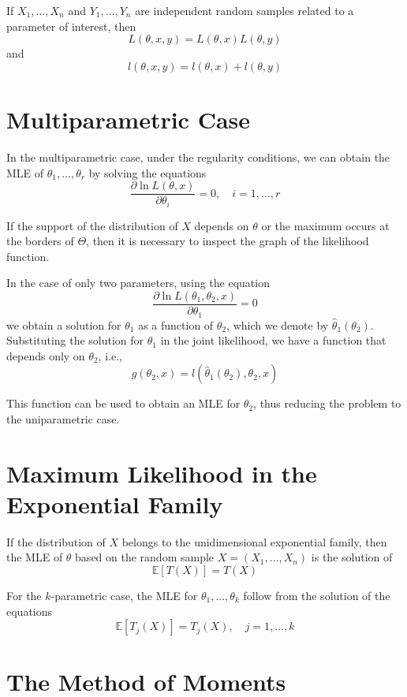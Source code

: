\documentclass[12pt,a4paper]{report}
\begin{document}
\begin{theorem}
    If $X_1, \ldots, X_n$ and $Y_1, \ldots, Y_n$ are independent random samples related to a parameter of interest, then 
    \[
        L(\theta, x, y) = L(\theta, x) L(\theta, y)
    \]
    and 
    \[
        l(\theta, x, y) = l(\theta, x) + l(\theta, y)
    \]
\end{theorem}

\section{Multiparametric Case}

In the multiparametric case, under the regularity conditions, we can obtain the MLE of $\theta_1, \ldots, \theta_r$ by solving the equations 
\[
    \frac{\partial \ln L(\theta,x)}{\partial \theta_i} = 0, \quad i = 1, \ldots, r
\]

If the support of the distribution of $X$ depends on $\theta$ or the maximum occurs at the borders of $\Theta$, then it is necessary to inspect the graph of the likelihood function.

In the case of only two parameters, using the equation 
\[
    \frac{\partial \ln L(\theta_1, \theta_2,x)}{\partial \theta_1} = 0
\]
we obtain a solution for $\theta_1$ as a function of $\theta_2$, which we denote by $\hat{\theta}_1(\theta_2)$. Substituting the solution for $\theta_1$ in the joint likelihood, we have a function that depends only on $\theta_2$, i.e.,
\[
    g(\theta_2, x) = l(\hat{\theta}_1(\theta_2), \theta_2, x)
\]

This function can be used to obtain an MLE for $\theta_2$, thus reducing the problem to the uniparametric case. 

\section{Maximum Likelihood in the Exponential Family}

If the distribution of $X$ belongs to the unidimensional exponential family, then the MLE of $\theta$ based on the random sample $X = (X_1, \ldots, X_n)$ is the solution of 
\[
    \mathbb{E}[T(X)] = T(X)
\]

For the $k$-parametric case, the MLE for $\theta_1, \ldots, \theta_k$ follow from the solution of the equations
\[
    \mathbb{E}[T_j(X)] = T_j(X), \quad j = 1, \ldots, k
\]

\section{The Method of Moments}
\end{document}
